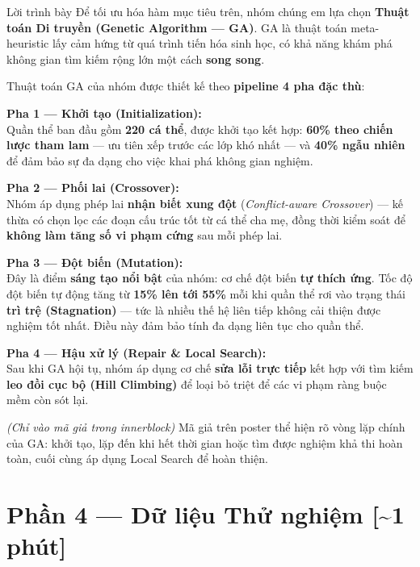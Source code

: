 \documentclass[12pt, a4paper]{article}
\begin{document}
\begin{scriptbox}{Lời trình bày}
Để tối ưu hóa hàm mục tiêu trên, nhóm chúng em lựa chọn \textbf{Thuật toán Di truyền (Genetic Algorithm --- GA)}. GA là thuật toán meta-heuristic lấy cảm hứng từ quá trình tiến hóa sinh học, có khả năng khám phá không gian tìm kiếm rộng lớn một cách \textbf{song song}.

\medskip
Thuật toán GA của nhóm được thiết kế theo \textbf{pipeline 4 pha đặc thù}:

\medskip
\textbf{Pha 1 --- Khởi tạo (Initialization):}\\
Quần thể ban đầu gồm \textbf{220 cá thể}, được khởi tạo kết hợp: \textbf{60\% theo chiến lược tham lam} --- ưu tiên xếp trước các lớp khó nhất --- và \textbf{40\% ngẫu nhiên} để đảm bảo sự đa dạng cho việc khai phá không gian nghiệm.

\medskip
\textbf{Pha 2 --- Phối lai (Crossover):}\\
Nhóm áp dụng phép lai \textbf{nhận biết xung đột} (\textit{Conflict-aware Crossover}) --- kế thừa có chọn lọc các đoạn cấu trúc tốt từ cá thể cha mẹ, đồng thời kiểm soát để \textbf{không làm tăng số vi phạm cứng} sau mỗi phép lai.

\medskip
\textbf{Pha 3 --- Đột biến (Mutation):}\\
Đây là điểm \textbf{sáng tạo nổi bật} của nhóm: cơ chế đột biến \textbf{tự thích ứng}. Tốc độ đột biến tự động tăng từ \textbf{15\% lên tới 55\%} mỗi khi quần thể rơi vào trạng thái \textbf{trì trệ (Stagnation)} --- tức là nhiều thế hệ liên tiếp không cải thiện được nghiệm tốt nhất. Điều này đảm bảo tính đa dạng liên tục cho quần thể.

\medskip
\textbf{Pha 4 --- Hậu xử lý (Repair \& Local Search):}\\
Sau khi GA hội tụ, nhóm áp dụng cơ chế \textbf{sửa lỗi trực tiếp} kết hợp với tìm kiếm \textbf{leo đồi cục bộ (Hill Climbing)} để loại bỏ triệt để các vi phạm ràng buộc mềm còn sót lại.

\medskip
\textit{(Chỉ vào mã giả trong innerblock)} \quad Mã giả trên poster thể hiện rõ vòng lặp chính của GA: khởi tạo, lặp đến khi hết thời gian hoặc tìm được nghiệm khả thi hoàn toàn, cuối cùng áp dụng Local Search để hoàn thiện.
\end{scriptbox}

\section{Phần 4 — Dữ liệu Thử nghiệm \hfill{\normalfont\color{MidGray}[\textasciitilde{}1 phút]}}
\end{document}
